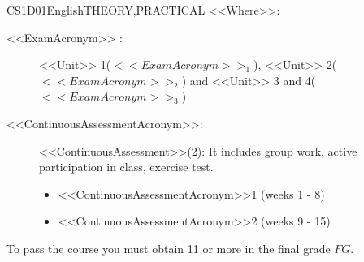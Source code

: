 \begin{evaluation}{CS1D01}{English}{THEORY,PRACTICAL}
    \vspace{2mm}
    \noindent <<Where>>:
    \begin{description}
        \item[<<ExamAcronym>> :] <<Unit>> 1($<<ExamAcronym>>_{1}$), <<Unit>> 2($<<ExamAcronym>>_{2}$) and <<Unit>> 3 and 4($<<ExamAcronym>>_{3}$) 
        \item[<<ContinuousAssessmentAcronym>>:]<<ContinuousAssessment>>(2): It includes group work, active participation in class, exercise test.
        \begin{itemize}
              \item <<ContinuousAssessmentAcronym>>1 (weeks 1 - 8) 
              \item <<ContinuousAssessmentAcronym>>2 (weeks 9 - 15)
        \end{itemize}
    \end{description}
  \noindent To pass the course you must obtain 11 or more in the final grade $FG$.
  \end{evaluation}
 
